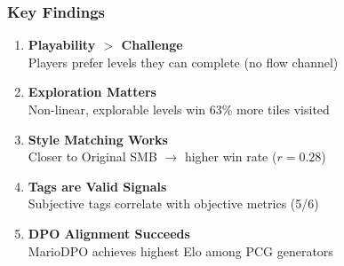 \documentclass{beamer}
\begin{document}
\begin{frame}
\frametitle{Key Findings}

\begin{enumerate}
    \item \textbf{Playability $>$ Challenge}\\
    Players prefer levels they can complete (no flow channel)
    
    \vspace{0.5em}
    \item \textbf{Exploration Matters}\\
    Non-linear, explorable levels win 63\% more tiles visited
    
    \vspace{0.5em}
    \item \textbf{Style Matching Works}\\
    Closer to Original SMB $\rightarrow$ higher win rate ($r = 0.28$)
    
    \vspace{0.5em}
    \item \textbf{Tags are Valid Signals}\\
    Subjective tags correlate with objective metrics (5/6)
    
    \vspace{0.5em}
    \item \textbf{DPO Alignment Succeeds}\\
    MarioDPO achieves \alert{highest Elo} among PCG generators
\end{enumerate}

\end{frame}
\end{document}
